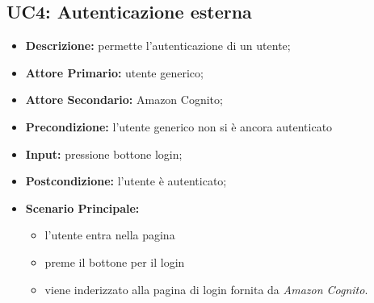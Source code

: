 \subsection{UC4: Autenticazione esterna}
        \label{sec:UC4}
        \begin{itemize}
            \item \textbf{Descrizione:} permette l'autenticazione di un utente;
            \item \textbf{Attore Primario:} utente generico;
            \item \textbf{Attore Secondario:} Amazon Cognito;
            \item \textbf{Precondizione:} l'utente generico non si è ancora autenticato
            \item \textbf{Input:} pressione bottone login;
            \item \textbf{Postcondizione:} l'utente è autenticato;
            \item \textbf{Scenario Principale:} 
            \begin{itemize}
                \item l'utente entra nella pagina
                \item preme il bottone per il login
                \item viene inderizzato alla pagina di login fornita da \textit{Amazon Cognito}.
            \end{itemize}
        \end{itemize}